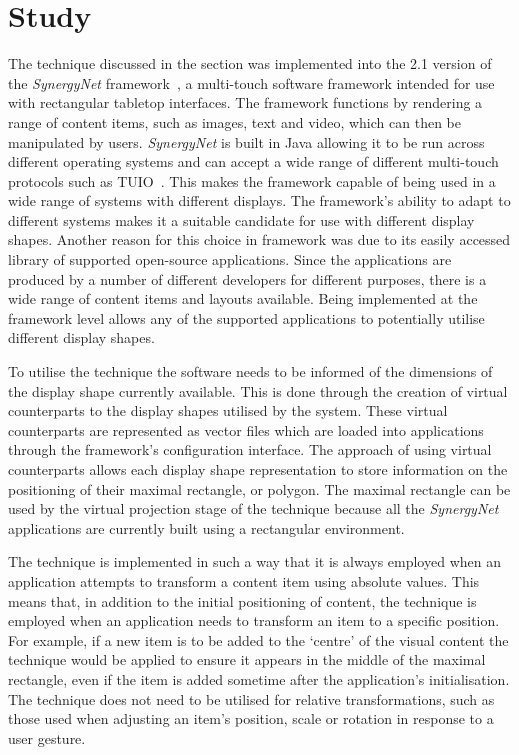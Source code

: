 \documentclass{bmcart}
\begin{document}
\section*{Study}
\label{sec:study}

The technique discussed in the  section was implemented into the 2.1 version of the {\emph{SynergyNet}} framework~\cite{McNaughton2017,AlAgha2010}, a multi-touch software framework intended for use with rectangular tabletop interfaces.
The framework functions by rendering a range of content items, such as images, text and video, which can then be manipulated by users.
{\emph{SynergyNet}} is built in Java allowing it to be run across different operating systems and can accept a wide range of different multi-touch protocols such as TUIO~\cite{Kaltenbrunner2007}.
This makes the framework capable of being used in a wide range of systems with different displays.
The framework's ability to adapt to different systems makes it a suitable candidate for use with different display shapes.
Another reason for this choice in framework was due to its easily accessed library of supported open-source applications.
Since the applications are produced by a number of different developers for different purposes, there is a wide range of content items and layouts available.
Being implemented at the framework level allows any of the supported applications to potentially utilise different display shapes.

To utilise the technique the software needs to be informed of the dimensions of the display shape currently available.
This is done through the creation of virtual counterparts to the display shapes utilised by the system.
These virtual counterparts are represented as vector files which are loaded into applications through the framework's configuration interface.
The approach of using virtual counterparts allows each display shape representation to store information on the positioning of their maximal rectangle, or polygon.
The maximal rectangle can be used by the virtual projection stage of the technique because all the {\emph{SynergyNet}} applications are currently built using a rectangular environment.

The technique is implemented in such a way that it is always employed when an application attempts to transform a content item using absolute values.
This means that, in addition to the initial positioning of content, the technique is employed when an application needs to transform an item to a specific position.
For example, if a new item is to be added to the `centre' of the visual content the technique would be applied to ensure it appears in the middle of the maximal rectangle, even if the item is added sometime after the application's initialisation.
The technique does not need to be utilised for relative transformations, such as those used when adjusting an item's position, scale or rotation in response to a user gesture.
\end{document}
